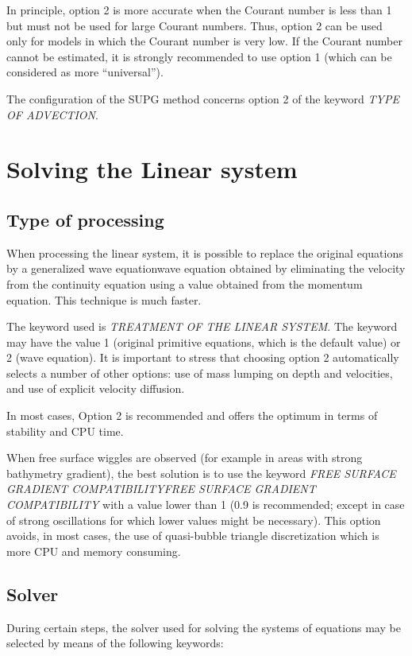  In principle, option 2 is more accurate when the Courant number is less than 1 but must not be used for large Courant numbers. Thus, option 2 can be used only for models in which the Courant number is very low. If the Courant number cannot be estimated, it is strongly recommended to use option 1 (which can be considered as more ``universal'').

 The configuration of the SUPG method concerns option 2 of the keyword \textit{TYPE OF ADVECTION}.


\section{  Solving the Linear system}


\subsection{ Type of processing}

 When processing the linear system, it is possible to replace the original equations by a generalized wave equationwave equation obtained by eliminating the velocity from the continuity equation using a value obtained from the momentum equation. This technique is much faster.

 The keyword used is \textit{TREATMENT OF THE LINEAR SYSTEM}. The keyword may have the value 1 (original primitive equations, which is the default value) or 2 (wave equation). It is important to stress that choosing option 2 automatically selects a number of other options: use of mass lumping on depth and velocities, and use of explicit velocity diffusion.

 In most cases, Option 2 is recommended and offers the optimum in terms of stability and CPU time.

 When free surface wiggles are observed (for example in areas with strong bathymetry gradient), the best solution is to use the keyword \textit{FREE SURFACE GRADIENT COMPATIBILITYFREE SURFACE GRADIENT COMPATIBILITY} with a value lower than 1 (0.9 is recommended; except in case of strong oscillations for which lower values might be necessary). This option avoids, in most cases, the use of quasi-bubble triangle discretization which is more CPU and memory consuming.


\subsection{ Solver}

 During certain steps, the solver used for solving the systems of equations may be selected by means of the following keywords:

